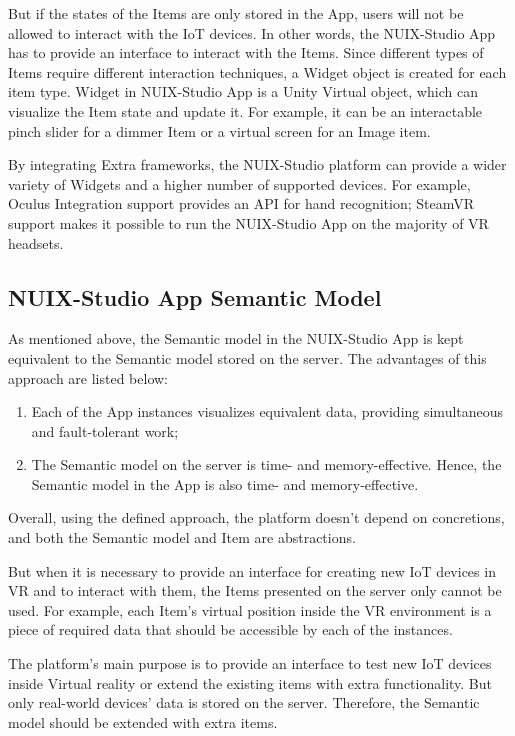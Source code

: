 But if the states of the Items are only stored in the App, users will not be allowed to interact with the IoT devices. In other words, the NUIX-Studio App has to provide an interface to interact with the Items. Since different types of Items require different interaction techniques, a Widget object is created for each item type.
Widget in NUIX-Studio App is a Unity Virtual object, which can visualize the Item state and update it. For example, it can be an interactable pinch slider for a dimmer Item or a virtual screen for an Image item.

By integrating Extra frameworks, the NUIX-Studio platform can provide a wider variety of Widgets and a higher number of supported devices. For example, Oculus Integration support provides an API for hand recognition; SteamVR~\cite{SteamVR2021} support makes it possible to run the NUIX-Studio App on the majority of VR headsets.

\subsection{NUIX-Studio App Semantic Model}

As mentioned above, the Semantic model in the NUIX-Studio App is kept equivalent to the Semantic model stored on the server. The advantages of this approach are listed below:

\begin{enumerate}
    \item Each of the App instances visualizes equivalent data, providing simultaneous and fault-tolerant work;
    \item The Semantic model on the server is time- and memory-effective. Hence, the Semantic model in the App is also time- and memory-effective.
\end{enumerate}

Overall, using the defined approach, the platform doesn't depend on concretions, and both the Semantic model and Item are abstractions.

But when it is necessary to provide an interface for creating new IoT devices in VR and to interact with them, the Items presented on the server only cannot be used. For example, each Item's virtual position inside the VR environment is a piece of required data that should be accessible by each of the instances.

The platform's main purpose is to provide an interface to test new IoT devices inside Virtual reality or extend the existing items with extra functionality. But only real-world devices' data is stored on the server. Therefore, the Semantic model should be extended with extra items. 